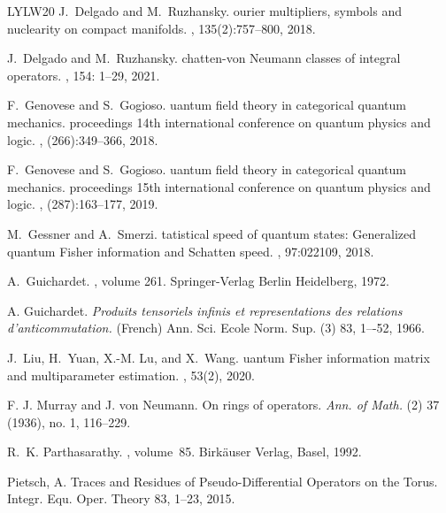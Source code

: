\documentclass[a4paper,12pt,reqno]{amsart}
\theoremstyle{definition}
\theoremstyle{remark}
\numberwithin{equation}{section}
\begin{document}
\begin{thebibliography}{LYLW20}
J.~Delgado and M.~Ruzhansky.
ourier multipliers, symbols and nuclearity on compact manifolds.
, 135(2):757$–$800, 2018.

J.~Delgado and M.~Ruzhansky.
chatten-von {N}eumann classes of integral operators.
, 154: 1--29, 2021.

F.~Genovese and S.~Gogioso.
uantum field theory in categorical quantum mechanics. proceedings
  14th international conference on quantum physics and logic.
, (266):349--366, 2018.

F.~Genovese and S.~Gogioso.
uantum field theory in categorical quantum mechanics. proceedings
  15th international conference on quantum physics and logic.
, (287):163--177, 2019.

M.~Gessner and A.~Smerzi.
tatistical speed of quantum states: {G}eneralized quantum {F}isher
  information and {S}chatten speed.
, 97:022109, 2018.

A.~Guichardet.
, volume 261.
\newblock Springer-Verlag Berlin Heidelberg, 1972.%

 A. Guichardet.  {\em  Produits tensoriels infinis et representations des relations d'anticommutation.} (French) Ann. Sci. Ecole Norm. Sup. (3) 83, 1–-52, 1966.%

J.~Liu, H.~Yuan, X.-M. Lu, and X.~Wang.
uantum {F}isher information matrix and multiparameter estimation.
, 53(2), 2020.

 F. J. Murray and J. von Neumann. On rings of operators. {\em Ann. of Math.} (2) 37 (1936), no. 1, 116–229.


R.~K. Parthasarathy.
, volume~85.
\newblock Birk\"auser Verlag, Basel, 1992.

Pietsch, A. Traces and Residues of Pseudo-Differential Operators on the Torus. Integr. Equ. Oper. Theory 83, 1–23, 2015.


\end{thebibliography}
\end{document}
